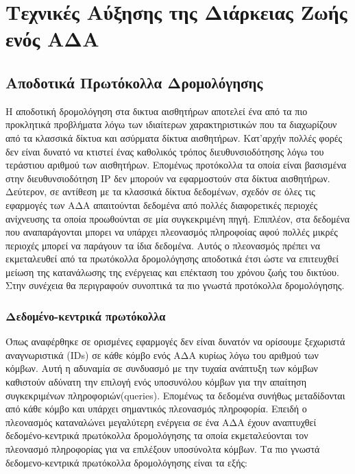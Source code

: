
\chapter{Τεχνικές Αύξησης της Διάρκειας Ζωής ενός ΑΔΑ}\label{ch:energy_reduction}


\section{Αποδοτικά Πρωτόκολλα Δρομολόγησης}
Η αποδοτική δρομολόγηση στα δικτυα αισθητήρων αποτελεί ένα από τα πιο προκλητικά προβλήματα λόγω των ιδιαίτερων χαρακτηριστικών που τα διαχωρίζουν από τα κλασσικά
δίκτυα και ασύρματα δίκτυα αισθητήρων.
Κατ'αρχήν πολλές φορές δεν είναι δυνατό να κτιστεί ένας καθολικός τρόπος διευθυνσιοδότησης λόγω του τεράστιου αριθμού των αισθητήρων.
Επομένως προτόκολλα τα οποία είναι βασισμένα στην διευθυνσιοδότηση IP δεν μπορούν να εφαρμοστούν στα δίκτυα αισθητήρων.
Δεύτερον, σε αντίθεση με τα κλασσικά δίκτυα δεδομένων, σχεδόν σε όλες τις εφαρμογές των ΑΔΑ απαιτούνται δεδομένα από πολλές διαφορετικές περιοχές ανίχνευσης τα
οποία προωθούνται σε μία συγκεκριμένη πηγή.
Επιπλέον, στα δεδομένα που αναπαράγονται μπορει να υπάρχει πλεονασμός πληροφοίας αφού πολλές μικρές περιοχές μπορεί να παράγουν τα ίδια δεδομένα.
Αυτός ο πλεονασμός πρέπει να εκμεταλευθεί από τα πρωτόκολλα δρομολόγησης αποδοτικά έτσι ώστε να επιτευχθεί μείωση της κατανάλωσης της ενέργειας και επέκταση του
χρόνου ζωής του δικτύου.
Στην συνέχεια θα περιγραφούν συνοπτικά τα πιο γνωστά προτόκολλα δρομολόγησης.


\subsection{Δεδομένο-κεντρικά πρωτόκολλα}
Όπως αναφέρθηκε σε ορισμένες εφαρμογές δεν είναι δυνατόν να ορίσουμε ξεχωριστά αναγνωριστικά (IDs) σε κάθε κόμβο ενός ΑΔΑ κυρίως λόγω του αριθμού των κόμβων.
Αυτή η αδυναμία σε συνδυασμό με την τυχαία ανάπτυξη των κόμβων καθιστούν αδύνατη την επιλογή ενός υποσυνόλου κόμβων για την απαίτηση
συγκεκριμένων πληροφοριών(queries).
Επομένως τα δεδομένα συνήθως μεταδίδονται από κάθε κόμβο και υπάρχει σημαντικός πλεονασμός πληροφορία.
Επειδή ο πλεονασμός καταναλώνει μεγαλύτερη ενέργεια σε ένα ΑΔΑ έχουν αναπτυχθεί δεδομένο-κεντρικά πρωτόκολλα δρομολόγησης τα οποία εκμεταλεύονται τον πλεονασμό
πληροφορίας για να επιλέξουν υποσύνολτα κόμβων. Τα πιο γνωστά δεδομενο-κεντρικά πρωτόκολλα δρομολόγησης είναι τα εξής:

